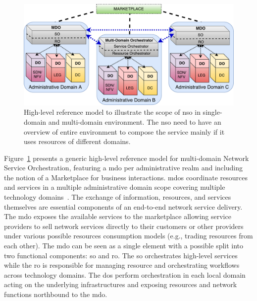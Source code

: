 \begin{figure}[th]
  \centering
  \includegraphics[scale=.5]{Figures/01_Introduction/fig3.pdf}
    \caption{High-level reference model to illustrate the scope of \acrfull{nso} in single-domain and multi-domain environment. The \gls{nso}  need to have an overview of entire environment to compose the service mainly if it uses resources of different domains.}
    \label{mdo}
\end{figure}

Figure~\ref{mdo} presents a generic high-level reference model for multi-domain Network Service Orchestration, featuring a \gls{mdo} per administrative realm and including the notion of a Marketplace for business interactions. 
\glspl{mdo} coordinate resources and services in a multiple administrative domain scope covering multiple technology domains~\cite{5GPPPArchitectureWorkingGroup2016ViewArchitecture}. 
The exchange of information, resources, and services themselves are essential components of an end-to-end network service delivery.  The \gls{mdo} exposes the available services to the marketplace allowing service providers to sell network services directly to their customers or other providers under various possible resources consumption models (e.g., trading resources from each other). 
The \gls{mdo} can be seen as a single element with a possible split into two functional components: \gls{so} and \gls{ro}. The \gls{so} orchestrates high-level services while the \gls{ro} is responsible for managing resource and orchestrating workflows across technology domains. 
The \glspl{do} perform orchestration in each local domain acting on the underlying infrastructures and exposing resources and network functions northbound to the \gls{mdo}. 

